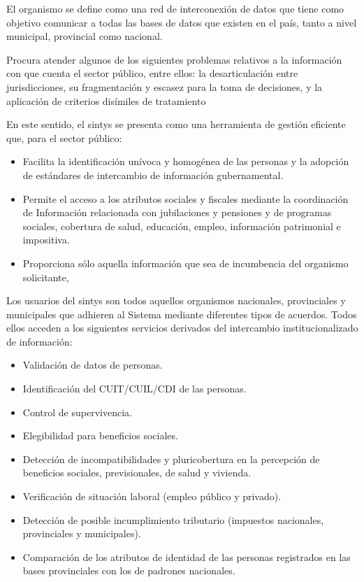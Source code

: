 El organismo se define como una red de interconexión de datos que tiene como objetivo comunicar a todas las bases de datos que existen en el país, tanto a nivel municipal, provincial como nacional. 

Procura atender algunos de los siguientes problemas relativos a la información  con que cuenta el sector público, entre ellos: la desarticulación entre jurisdicciones, su fragmentación y escasez para la toma de decisiones, y la aplicación  de  criterios disímiles de tratamiento

En este sentido, el \ac{sintys}  se presenta como una herramienta de gestión eficiente que, para el  sector público:
    \begin{itemize}
        \item Facilita la identificación unívoca y homogénea de las personas y la adopción de estándares de intercambio de información gubernamental.
        \item Permite el acceso a los atributos sociales y fiscales mediante la coordinación de Información relacionada con jubilaciones y pensiones y de programas sociales, cobertura de salud, educación, empleo, información patrimonial e impositiva.
        \item Proporciona sólo aquella información que sea de incumbencia del organismo solicitante,
    \end{itemize}

Los usuarios del \ac{sintys} son todos aquellos organismos nacionales, provinciales y municipales que adhieren al Sistema mediante diferentes tipos de acuerdos. Todos ellos acceden a los siguientes servicios derivados del intercambio institucionalizado de información: 
    \begin{itemize}
        \item Validación de datos de personas. 
        \item Identificación del CUIT/CUIL/CDI de las personas. 
        \item Control de supervivencia. 
        \item Elegibilidad para beneficios sociales. 
        \item Detección de incompatibilidades y pluricobertura en la percepción de beneficios sociales, previsionales, de salud y vivienda. 
        \item Verificación de situación laboral (empleo público y privado). 
        \item Detección de posible incumplimiento tributario (impuestos nacionales, provinciales y municipales). 
        \item Comparación de los atributos de identidad de las personas registrados en las bases provinciales con los de padrones nacionales. 
    \end{itemize}

